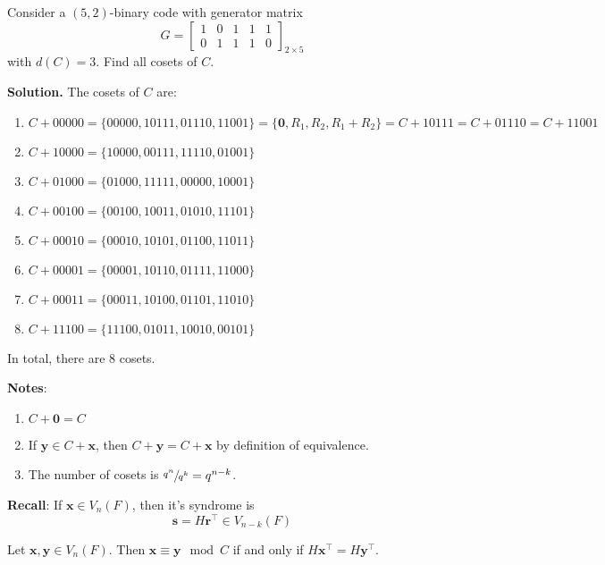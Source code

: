 \begin{exbox}
    \begin{example}[Cosets]
        Consider a $ (5,2) $-binary code with generator matrix
        \[ G=\begin{bmatrix}
                1 & 0 & 1 & 1 & 1 \\
                0 & 1 & 1 & 1 & 0
            \end{bmatrix}_{2\times 5} \]
        with $ d(C)=3 $. Find all cosets of $ C $.

        \textbf{Solution.} The cosets of $ C $ are:
        \begin{enumerate}[label=(\arabic*)]
            \item $ C+00000=\{00000,10111,01110,11001\}=\{\bm{0},R_1,R_2, R_1+R_2\}
                      = C+10111 = C+01110 = C + 11001 $
            \item $ C+10000=\{10000,00111,11110,01001\} $
            \item $ C+01000=\{01000,11111,00000,10001\} $
            \item $ C+00100=\{00100,10011,01010,11101\} $
            \item $ C+00010=\{00010,10101,01100,11011\} $
            \item $ C+00001=\{00001,10110,01111,11000\} $
            \item $ C+00011=\{00011,10100,01101,11010\} $
            \item $ C+11100=\{11100,01011,10010,00101\} $
        \end{enumerate}
        In total, there are $ 8 $ cosets.
    \end{example}
\end{exbox}

\textbf{Notes}:
\begin{enumerate}[label=(\arabic*)]
    \item $ C+\bm{0}=C $
    \item If $ \bm{y}\in C+\bm{x} $, then $ C+\bm{y}=C+\bm{x} $ by definition
          of equivalence.
    \item The number of cosets is $ \sfrac{q^n}{q^k}=q^{n-k} $.
\end{enumerate}

\textbf{Recall}: If $ \bm{x}\in V_n(F) $, then it's syndrome is
\[ \bm{s}=H\bm{r}^\top\in V_{n-k}(F) \]

\begin{thmbox}
    \begin{theorem}
        Let $ \bm{x},\bm{y}\in V_n(F) $. Then $ \bm{x}\equiv \bm{y}\mod C $
        if and only if $ H\bm{x}^\top=H\bm{y}^\top $.
    \end{theorem}
\end{thmbox}

